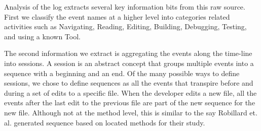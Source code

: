 \documentclass{sig-alternate}
\begin{document}
Analysis of the log extracts several key information bits from this raw source.  First we classify the event names at a higher level into categories related activities such as Navigating, Reading, Editing, Building, Debugging,  Testing, and using a  known Tool.  

The second information we extract is aggregating the events along the time-line into sessions.  A session is an abstract concept that groups multiple events into a sequence with a beginning and an end.  Of the many possible ways to define sessions, we chose to define sequences as all the events that transpire before and during a set of edits to a specific file.  When the developer edits a new file, all the events after the last edit to the previous file are part of the new sequence for the new file.  Although not at the method level, this is similar to the say Robillard et. al. generated sequence based on located methods for their study.\cite{wbsnipes:Robillard2004How}

%
%
%
\end{document}
